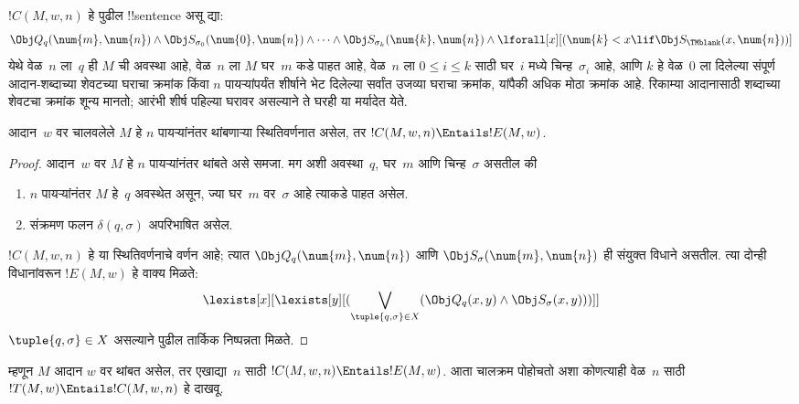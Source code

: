\documentclass[../../../include/open-logic-section]{subfiles}
\begin{document}
\begin{defn} 
$!C(M, w, n)$ हे पुढील
!!{sentence} असू द्या:
\[ 
\Obj Q_q(\num{m}, \num{n}) \land \Obj S_{\sigma_0}(\num{0}, \num{n})
\land \dots \land \Obj S_{\sigma_k}(\num{k}, \num{n}) \land
\lforall[x][(\num{k} < x \lif \Obj S_\TMblank(x, \num{n}))]
\] 
येथे वेळ~$n$ ला~$q$
ही $M$ ची अवस्था आहे,
वेळ~$n$ ला $M$ घर~$m$
कडे पाहत आहे, वेळ~$n$
ला $0 \le i \le k$
साठी घर~$i$ मध्ये
चिन्ह~$\sigma_i$ आहे,
आणि $k$ हे वेळ~$0$
ला दिलेल्या संपूर्ण आदान-शब्दाच्या शेवटच्या
घराचा क्रमांक किंवा $n$ पायऱ्यांपर्यंत
शीर्षाने भेट दिलेल्या सर्वांत उजव्या
घराचा क्रमांक, यांपैकी अधिक मोठा क्रमांक आहे.
रिकाम्या आदानासाठी शब्दाच्या शेवटचा क्रमांक
शून्य मानतो; आरंभी शीर्ष पहिल्या घरावर असल्याने
ते घरही या मर्यादेत येते.
%
\end{defn}

\begin{lem}
आदान~$w$ वर चालवलेले $M$
हे $n$ पायऱ्यांनंतर
थांबणाऱ्या स्थितिवर्णनात
असेल, तर $!C(M, w, n) \Entails !E(M, w)$.
\end{lem}

\begin{proof}
आदान~$w$ वर $M$ हे $n$
पायऱ्यांनंतर थांबते असे
समजा. मग अशी अवस्था~$q$,
घर~$m$ आणि चिन्ह~$\sigma$
असतील की
\begin{enumerate} 
\item $n$ पायऱ्यांनंतर $M$
  हे~$q$ अवस्थेत असून,
  ज्या घर~$m$ वर~$\sigma$
  आहे त्याकडे पाहत असेल.
\item संक्रमण फलन $\delta(q, \sigma)$
  अपरिभाषित असेल.
\end{enumerate}
$!C(M, w, n)$ हे या
स्थितिवर्णनाचे वर्णन आहे;
त्यात $\Obj Q_{q}(\num{m}, \num{n})$
आणि $\Obj
S_{\sigma}(\num{m}, \num{n})$
ही संयुक्त विधाने असतील.
त्या दोन्ही विधानांवरून
$!E(M, w)$ हे वाक्य मिळते:
\[
\lexists[x][\lexists[y][(\bigvee_{\tuple{q, \sigma} \in
      X}(\Obj Q_q(x, y) \land \Obj S_\sigma(x, y)))]]
\]
$\tuple{q,\sigma} \in X$ असल्याने पुढील तार्किक निष्पन्नता मिळते.
%
\end{proof}

\begin{explain}
म्हणून $M$ आदान $w$
वर थांबत असेल, तर
एखाद्या~$n$ साठी
$!C(M,
w, n) \Entails !E(M,w)$.
आता चालक्रम पोहोचतो अशा कोणत्याही वेळ~$n$
साठी $!T(M, w) \Entails !C(M, w, n)$
हे दाखवू.
\end{explain}
\end{document}
